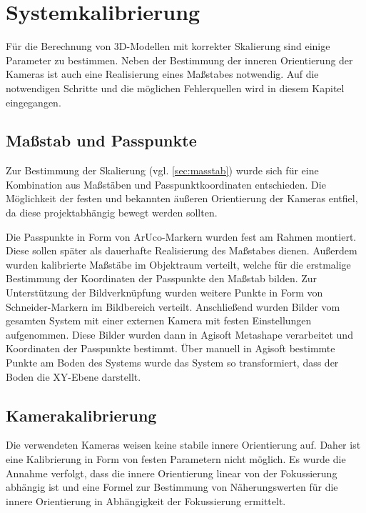 \documentclass[./00PhotoBox.tex]{subfiles}
\begin{document}
\chapter{Systemkalibrierung}

Für die Berechnung von 3D-Modellen mit korrekter Skalierung sind einige Parameter zu bestimmen. Neben der Bestimmung der inneren Orientierung der Kameras ist auch eine Realisierung eines Maßstabes notwendig. Auf die notwendigen Schritte und die möglichen Fehlerquellen wird in diesem Kapitel eingegangen.

\section{Maßstab und Passpunkte}
\label{sec:passpunkt_bestimmung}
Zur Bestimmung der Skalierung (vgl. \autoref{sec:masstab}) wurde sich für eine Kombination aus Maßstäben und Passpunktkoordinaten entschieden. Die Möglichkeit der festen und bekannten äußeren Orientierung der Kameras entfiel, da diese projektabhängig bewegt werden sollten.

Die Passpunkte in Form von ArUco-Markern wurden fest am Rahmen montiert. Diese sollen später als dauerhafte Realisierung des Maßstabes dienen. Außerdem wurden kalibrierte Maßstäbe im Objektraum verteilt, welche für die erstmalige Bestimmung der Koordinaten der Passpunkte den Maßstab bilden. Zur Unterstützung der Bildverknüpfung wurden weitere Punkte in Form von Schneider-Markern im Bildbereich verteilt. Anschließend wurden Bilder vom gesamten System mit  einer externen Kamera mit festen Einstellungen aufgenommen. Diese Bilder wurden dann in Agisoft Metashape verarbeitet und Koordinaten der Passpunkte bestimmt. Über manuell in Agisoft bestimmte Punkte am Boden des Systems wurde das System so transformiert, dass der Boden die XY-Ebene darstellt.

\section{Kamerakalibrierung}
Die verwendeten Kameras weisen keine stabile innere Orientierung auf. Daher ist eine Kalibrierung in Form von festen Parametern nicht möglich. Es wurde die Annahme verfolgt, dass die innere Orientierung linear von der Fokussierung abhängig ist und eine Formel zur Bestimmung von Näherungswerten für die innere Orientierung in Abhängigkeit der Fokussierung ermittelt.
\end{document}
